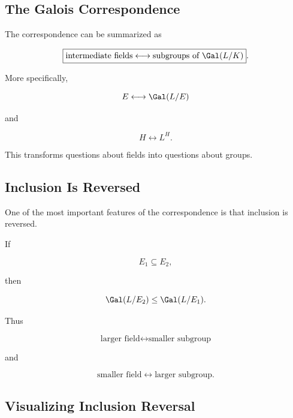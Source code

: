 \subsection{The Galois Correspondence}
\label{subsec:galois-correspondence}

The correspondence can be summarized as

\[ \boxed{\text{intermediate fields}\longleftrightarrow\text{subgroups of }\Gal(L/K)}. \]

More specifically,

\[ E\longleftrightarrow\Gal(L/E) \]

and

\[ H\longleftrightarrow L^H. \]

This transforms questions about fields into questions about groups.

\subsection{Inclusion Is Reversed}
\label{subsec:galois-inclusion-reversal}

One of the most important features of the correspondence is that inclusion is
reversed.

If

\[ E_1\subseteq E_2, \]

then

\[ \Gal(L/E_2)\leq\Gal(L/E_1). \]

Thus

\[
\boxed{
\text{larger field}
\longleftrightarrow
\text{smaller subgroup}
}
\]

and

\[
\boxed{
\text{smaller field}
\longleftrightarrow
\text{larger subgroup}.
}
\]

\subsection{Visualizing Inclusion Reversal}
\label{subsec:visual-galois-inclusion-reversal}


